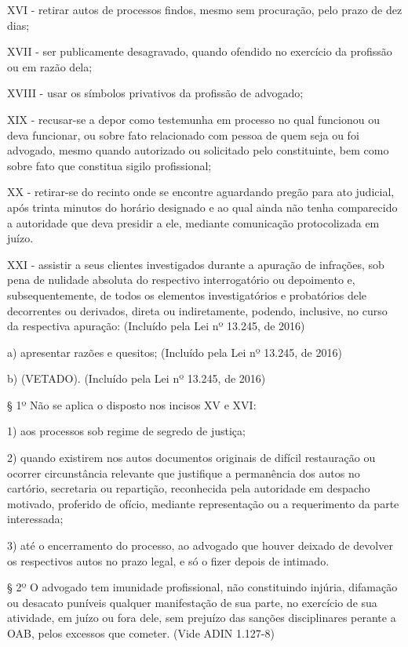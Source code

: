 \documentclass[12pt]{article}
\begin{document}
XVI - retirar autos de processos findos, mesmo sem procuração, pelo prazo de dez dias;

XVII - ser publicamente desagravado, quando ofendido no exercício da profissão ou em razão dela;

XVIII - usar os símbolos privativos da profissão de advogado;

XIX - recusar-se a depor como testemunha em processo no qual funcionou ou deva funcionar, ou sobre fato relacionado com pessoa de quem seja ou foi advogado, mesmo quando autorizado ou solicitado pelo constituinte, bem como sobre fato que constitua sigilo profissional;

XX - retirar-se do recinto onde se encontre aguardando pregão para ato judicial, após trinta minutos do horário designado e ao qual ainda não tenha comparecido a autoridade que deva presidir a ele, mediante comunicação protocolizada em juízo.

XXI - assistir a seus clientes investigados durante a apuração de infrações, sob pena de nulidade absoluta do respectivo interrogatório ou depoimento e, subsequentemente, de todos os elementos investigatórios e probatórios dele decorrentes ou derivados, direta ou indiretamente, podendo, inclusive, no curso da respectiva apuração:         (Incluído pela Lei nº 13.245, de 2016)

a) apresentar razões e quesitos;         (Incluído pela Lei nº 13.245, de 2016)

b) (VETADO).         (Incluído pela Lei nº 13.245, de 2016)

§ 1º Não se aplica o disposto nos incisos XV e XVI:

1) aos processos sob regime de segredo de justiça;

2) quando existirem nos autos documentos originais de difícil restauração ou ocorrer circunstância relevante que justifique a permanência dos autos no cartório, secretaria ou repartição, reconhecida pela autoridade em despacho motivado, proferido de ofício, mediante representação ou a requerimento da parte interessada;

3) até o encerramento do processo, ao advogado que houver deixado de devolver os respectivos autos no prazo legal, e só o fizer depois de intimado.

§ 2º O advogado tem imunidade profissional, não constituindo injúria, difamação ou desacato puníveis qualquer manifestação de sua parte, no exercício de sua atividade, em juízo ou fora dele, sem prejuízo das sanções disciplinares perante a OAB, pelos excessos que cometer.        (Vide ADIN 1.127-8)
\end{document}

